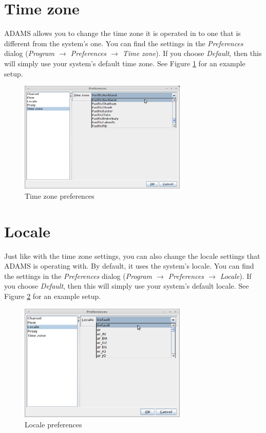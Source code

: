 \section{Time zone}
ADAMS allows you to change the time zone it is operated in to one that is
different from the system's one. You can find the settings in the
\textit{Preferences} dialog (\textit{Program $\rightarrow$ Preferences $\rightarrow$ Time zone}).
If you choose \textit{Default}, then this will simply use your system's
default time zone. See Figure \ref{timezone_setup} for an example setup.

\begin{figure}[htb]
  \centering
  \includegraphics[width=8.0cm]{images/timezone_setup.png}
  \caption{Time zone preferences}
  \label{timezone_setup}
\end{figure}


\section{Locale}
Just like with the time zone settings, you can also change the locale settings
that ADAMS is operating with. By default, it uses the system's locale.
You can find the settings in the
\textit{Preferences} dialog (\textit{Program $\rightarrow$ Preferences $\rightarrow$ Locale}).
If you choose \textit{Default}, then this will simply use your system's
default locale. See Figure \ref{locale_setup} for an example setup.

\begin{figure}[htb]
  \centering
  \includegraphics[width=8.0cm]{images/locale_setup.png}
  \caption{Locale preferences}
  \label{locale_setup}
\end{figure}



